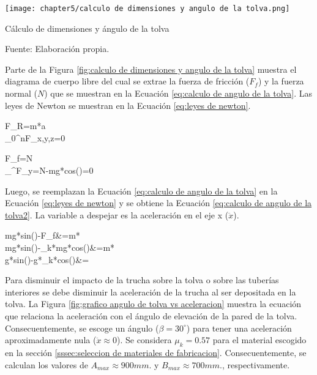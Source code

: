 \begin{myfigure}[H]
	\footnotesize\centering
	\texttt{[image: chapter5/calculo de dimensiones y angulo de la tolva.png]}
	\caption{Cálculo de dimensiones y ángulo de la tolva}
	\begin{myflushcenter}
		Fuente: Elaboración propia.
	\end{myflushcenter}
	\label{fig:calculo de dimensiones y angulo de la tolva}
\end{myfigure}

Parte de la Figura \ref{fig:calculo de dimensiones y angulo de la tolva} muestra el diagrama de cuerpo libre del cual se extrae la fuerza de fricción ($F_{f}$) y la fuerza normal ($N$) que se muestran en la Ecuación \ref{eq:calculo de angulo de la tolva}. Las leyes de Newton se muestran en la Ecuación \ref{eq:leyes de newton}. 

\begin{myequation}\label{eq:leyes de newton}
	\begin{split}
		F_{R}=m*a \\
		\sum_{0}^{n}F_{x,y,z}=0
	\end{split}
\end{myequation}

\begin{myequation}\label{eq:calculo de angulo de la tolva}
	\begin{split}
		F_{f}=\mu*N  \\
		\sum_{}^{}F_{y}=N-mg*cos(\beta)=0
	\end{split}
\end{myequation}

Luego, se reemplazan la Ecuación \ref{eq:calculo de angulo de la tolva} en la Ecuación \ref{eq:leyes de newton} y se obtiene la Ecuación \ref{eq:calculo de angulo de la tolva2}. La variable a despejar es la aceleración en el eje x ($\ddot{x}$).

\begin{myequation}\label{eq:calculo de angulo de la tolva2}
	\begin{split}
		mg*sin(\beta)-F_{f}&=m*\ddot{x} \\
		mg*sin(\beta)-\mu_{k}*mg*cos(\beta)&=m*\ddot{x} \\
		g*sin(\beta)-g*\mu_{k}*cos(\beta)&=\ddot{x}
	\end{split}
\end{myequation}

Para disminuir el impacto de la trucha sobre la tolva o sobre las tuberías interiores se debe disminuir la aceleración de la trucha al ser depositada en la tolva. La Figura \ref{fig:grafico angulo de tolva vs aceleracion} muestra la ecuación que relaciona la aceleración con el ángulo de elevación de la pared de la tolva. Consecuentemente, se escoge un ángulo ($\beta=30^\circ$) para tener una aceleración aproximadamente nula ($\approx0$). Se considera $\mu_{k}=0.57$ para el material escogido en la sección \ref{sssec:seleccion de materiales de fabricacion}. Consecuentemente, se calculan los valores de $A_{max}\approx{900} mm.$ y $B_{max}\approx{700} mm.$, respectivamente.

